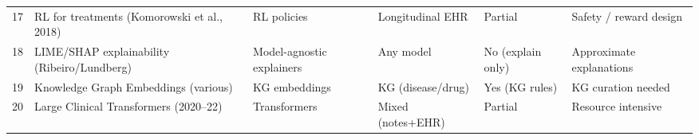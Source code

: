 \begin{table}
\begin{tabularx}{\textwidth}{@{}l l X X X X@{}}
17 & RL for treatments (Komorowski et al., 2018) & RL policies & Longitudinal EHR & Partial & Safety / reward design \\
18 & LIME/SHAP explainability (Ribeiro/Lundberg) & Model-agnostic explainers & Any model & No (explain only) & Approximate explanations \\
19 & Knowledge Graph Embeddings (various) & KG embeddings & KG (disease/drug) & Yes (KG rules) & KG curation needed \\
20 & Large Clinical Transformers (2020–22) & Transformers & Mixed (notes+EHR) & Partial & Resource intensive \\
\bottomrule
\end{tabularx}
\end{table}
